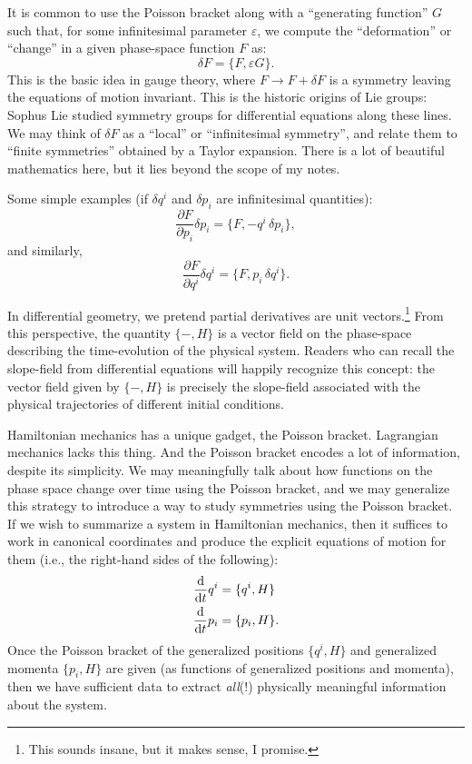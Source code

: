 \M
It is common to use the Poisson bracket along with a ``generating
function'' $G$ such that, for some infinitesimal parameter
$\varepsilon$, we compute the ``deformation'' or ``change'' in a given
phase-space function $F$ as:
\begin{equation}
\delta F = \{F,\varepsilon G\}.
\end{equation}
This is the basic idea in gauge theory, where $F\to F+\delta F$ is a
symmetry leaving the equations of motion invariant. This is the historic
origins of Lie groups: Sophus Lie studied symmetry groups for
differential equations along these lines. We may think of $\delta F$
as a ``local'' or ``infinitesimal symmetry'', and relate them to
``finite symmetries'' obtained by a Taylor expansion. There is a lot of
beautiful mathematics here, but it lies beyond the scope of my notes.

Some simple examples (if $\delta q^{i}$ and $\delta p_{i}$ are
infinitesimal quantities):
\begin{equation}
\frac{\partial F}{\partial p_{i}}\delta p_{i}
= \{F,-q^{i}\,\delta p_{i}\},
\end{equation}
and similarly,
\begin{equation}
\frac{\partial F}{\partial q^{i}}\delta q^{i}
= \{F,p_{i}\,\delta q^{i}\}.
\end{equation}

In differential geometry, we pretend partial derivatives are unit
vectors.\footnote{This sounds insane, but it makes sense, I promise.}
From this perspective, the quantity $\{-,H\}$ is a vector field on the
phase-space describing the time-evolution of the physical
system. Readers who can recall the slope-field from differential
equations will happily recognize this concept: the vector field given by
$\{-,H\}$ is precisely the slope-field associated with the physical
trajectories of different initial conditions.

Hamiltonian mechanics has a unique gadget, the Poisson
bracket. Lagrangian mechanics lacks this thing. And the Poisson bracket
encodes a lot of information, despite its simplicity. We may
meaningfully talk about how functions on the phase space change over
time using the Poisson bracket, and we may generalize this strategy to
introduce a way to study symmetries using the Poisson bracket.
If we wish to summarize a system in Hamiltonian mechanics, then it
suffices to work in canonical coordinates and produce the explicit
equations of motion for them (i.e., the right-hand sides of the following):
\begin{subequations}
\begin{align}
\frac{\mathrm{d}}{\mathrm{d} t}q^{i} &= \{q^{i}, H\}\\
\frac{\mathrm{d}}{\mathrm{d} t}p_{i} &= \{p_{i}, H\}.
\end{align}
\end{subequations}
Once the Poisson bracket of the generalized positions $\{q^{i},H\}$ and
generalized momenta $\{p_{i},H\}$ are given (as functions of generalized
positions and momenta), then we have sufficient data to extract \emph{all}(!)
physically meaningful information about the system.

